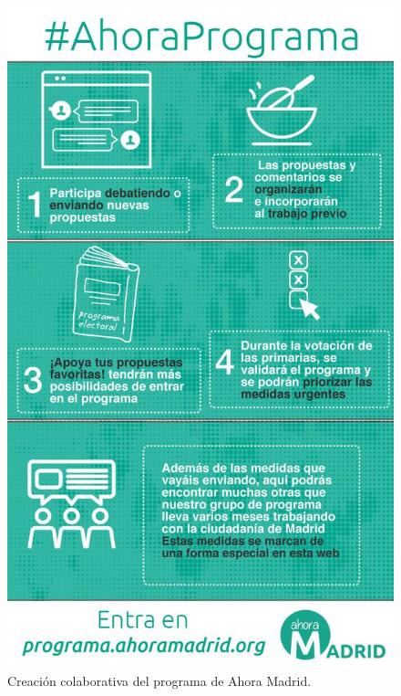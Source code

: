 \begin{figure}[H]
\centering
\includegraphics[keepaspectratio, scale=0.35]{Media/Captures/programaAhoraMadrid.jpg}
\caption{Creación colaborativa del programa de Ahora Madrid.}
\label{fig:programaAhoraMadrid}
\end{figure}
